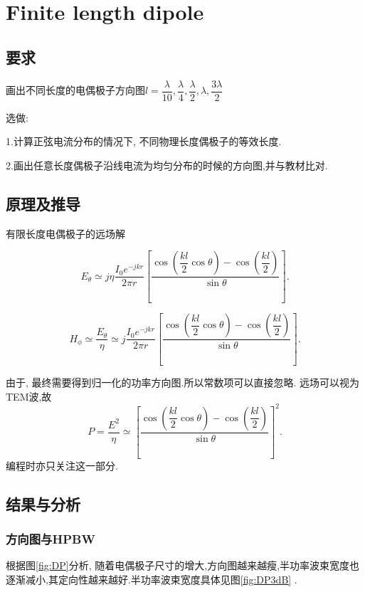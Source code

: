 


\section{Finite length dipole}
\subsection{要求}
\noindent 画出不同长度的电偶极子方向图$l=\dfrac{\lambda}{10},\dfrac{\lambda}{4},\dfrac{\lambda}{2},\lambda,\dfrac{3\lambda}{2}$ 

\noindent 选做:

1.计算正弦电流分布的情况下, 不同物理长度偶极子的等效长度.

2.画出任意长度偶极子沿线电流为均匀分布的时候的方向图,并与教材比对.

\subsection{原理及推导}
有限长度电偶极子的远场解


\begin{equation}
E_\theta\simeq j\eta\dfrac{I_0e^{-jkr}}{2\pi r}\left[\dfrac{\cos\left(\dfrac{kl}{2}\cos\theta\right)-\cos\left(\dfrac{kl}{2}\right)}{\sin\theta}\right].
\end{equation}


\begin{equation}
H_\phi\simeq \dfrac{E_\theta}{\eta}
\simeq j\dfrac{I_0e^{-jkr}}{2\pi r}\left[\dfrac{\cos\left(\dfrac{kl}{2}\cos\theta\right)-\cos\left(\dfrac{kl}{2}\right)}{\sin\theta}\right].
\end{equation}

由于, 最终需要得到归一化的功率方向图.所以常数项可以直接忽略. 
远场可以视为TEM波,故
\begin{equation}
P=\dfrac{E^2}{\eta} \simeq \left[\dfrac{\cos\left(\dfrac{kl}{2}\cos\theta\right)-\cos\left(\dfrac{kl}{2}\right)}{\sin\theta}\right]^2.
\end{equation}
编程时亦只关注这一部分. 
\subsection{结果与分析}
\subsubsection{方向图与HPBW}
根据图\ref{fig:DP}分析, 随着电偶极子尺寸的增大,方向图越来越瘦,半功率波束宽度也逐渐减小,其定向性越来越好.半功率波束宽度具体见图\ref{fig:DP3dB} .

